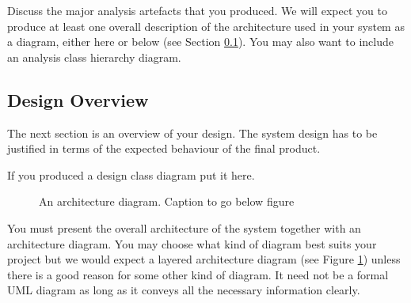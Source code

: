 \documentclass[11pt,a4paper]{article}
\begin{document}
Discuss the major analysis artefacts that you produced. We will expect
you to produce at least one overall description of the architecture
used in your system as a diagram, either here or below (see Section
\ref{ss:design-overview}). You may also want to include an analysis
class hierarchy diagram.

\subsection{Design Overview}
\label{ss:design-overview}

The next section is an overview of your design. The system design has
to be justified in terms of the expected behaviour of the final
product. 

If you produced a design class diagram put it here.

\begin{figure}[h!]
  \caption{An architecture diagram. Caption to go below figure}
  \label{fig:architecture}
\end{figure}

You must present the overall architecture of the system together with
an architecture diagram. You may choose what kind of diagram best
suits your project but we would expect a layered architecture diagram
(see Figure \ref{fig:architecture}) unless there is a good reason for
some other kind of diagram. It need not be a formal UML diagram as
long as it conveys all the necessary information clearly.
\end{document}
